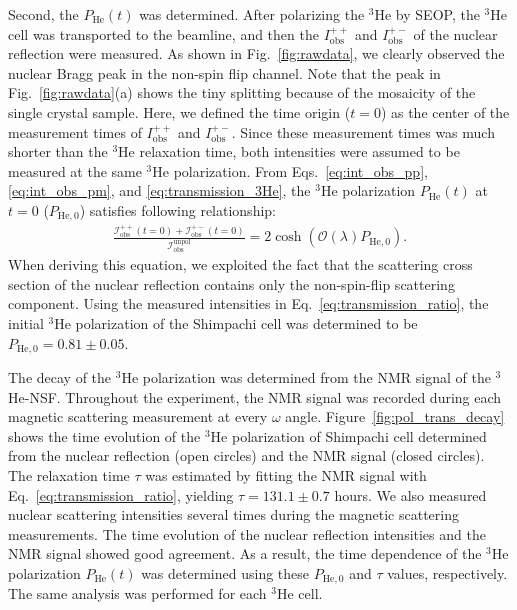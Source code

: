 \documentclass[%
 reprint,
superscriptaddress,
 amsmath,amssymb,
 aps,
floatfix,
]{revtex4-2}
\newcommand{\He}{$^3$He }
\newcommand{\Hensf}{$^3$He-NSF}
\begin{document}
    Second, the $P_\mathrm{He}(t)$ was determined.
    After polarizing the \He by SEOP, the \He cell was transported to the beamline, and then the $I^{++}_\mathrm{obs}$ and $I^{+-}_\mathrm{obs}$ of the nuclear reflection were measured.
    As shown in Fig.~\ref{fig:rawdata}, we clearly observed the nuclear Bragg peak in the non-spin flip channel.
    Note that the peak in Fig.~\ref{fig:rawdata}(a) shows the tiny splitting because of the mosaicity of the single crystal sample.
    Here, we defined the time origin ($t=0$) as the center of the measurement times of $I^{++}_\mathrm{obs}$ and $I^{+-}_\mathrm{obs}$.
    Since these measurement times was much shorter than the \He relaxation time, both intensities were assumed to be measured at the same \He polarization.
    From Eqs.~\ref{eq:int_obs_pp}, \ref{eq:int_obs_pm}, and \ref{eq:transmission_3He}, the \He polarization $P_\mathrm{He}(t)$ at $t=0$ ($P_\mathrm{He,0}$) satisfies following relationship:
    \begin{align}
        \frac{\mathcal{I}^{++}_\mathrm{obs}(t=0)+\mathcal{I}^{+-}_\mathrm{obs}(t=0)}{\mathcal{I}^\mathrm{unpol}_\mathrm{obs}} = 2\cosh(\mathcal{O}(\lambda)P_\mathrm{He,0}).
        \label{eq:transmission_ratio}
    \end{align}
    When deriving this equation, we exploited the fact that the scattering cross section of the nuclear reflection contains only the non-spin-flip scattering component.
    Using the measured intensities in Eq.~\ref{eq:transmission_ratio}, the initial \He polarization of the Shimpachi cell was determined to be $P_\mathrm{He,0}=0.81\pm0.05$.

The decay of the \He polarization was determined from the NMR signal of the \Hensf.
Throughout the experiment, the NMR signal was recorded during each magnetic scattering measurement at every $\omega$ angle.
Figure~\ref{fig:pol_trans_decay} shows the time evolution of the \He polarization of Shimpachi cell determined from the nuclear reflection (open circles) and the NMR signal (closed circles).
The relaxation time $\tau$ was estimated by fitting the NMR signal with Eq.~\ref{eq:transmission_ratio}, yielding $\tau = 131.1 \pm 0.7$ hours.
We also measured nuclear scattering intensities several times during the magnetic scattering measurements.
The time evolution of the nuclear reflection intensities and the NMR signal showed good agreement.
As a result, the time dependence of the \He polarization $P_\mathrm{He}(t)$ was determined using these $P_\mathrm{He,0}$ and $\tau$ values, respectively.
The same analysis was performed for each \He cell.
\end{document}
